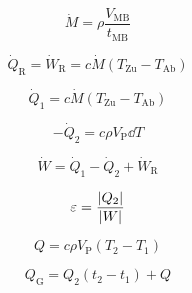 \documentclass[a4paper]{scrartcl}
\begin{document}
	\begin{equation} %
		\dot{M} = \rho \frac{V_\text{MB}}{t_\text{MB}}
	\end{equation} %
	
	\begin{equation} %
		\dot{Q}_\text{R} = \dot{W}_\text{R} = c \dot{M} (T_\text{Zu} - T_\text{Ab})
	\end{equation} %
	
	\begin{equation} %
	\dot{Q}_1 = c \dot{M} (T_\text{Zu} - T_\text{Ab})
	\end{equation} %
	
	\begin{equation} %
		-\dot{Q}_2 = c \rho V_\text{P} \dd T
	\end{equation} %
	
	\begin{equation} %
		\dot{W} = \dot{Q}_1 - \dot{Q}_2 + \dot{W}_\text{R}
	\end{equation} %
	
	\begin{equation} %
		\varepsilon = \frac{\abs{Q_2}}{\abs{W}}
	\end{equation} %
	
	\begin{equation} %
		Q = c \rho V_\text{P} (T_2 - T_1)
	\end{equation} %
	
	\begin{equation} %
		Q_\text{G} = Q_2 (t_2 - t_1) + Q
	\end{equation} %
	
\end{document}
